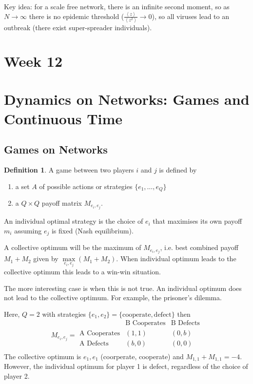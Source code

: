 \documentclass[12pt]{article}
\theoremstyle{definition}
\newtheorem{definition}{Definition}[section]
\newcommand{\ip}[1]{\left\langle{#1}\right\rangle}
\begin{document}
Key idea: for a scale free network, there is an infinite second moment, so as $N\to\infty$ there is no epidemic threshold ($\frac{\ip{z}}{\ip{z^2}}\to0$), so all viruses lead to an outbreak (there exist super-spreader individuals). 

\newpage
\section*{Week 12}

\section{Dynamics on Networks: Games and Continuous Time}

\subsection{Games on Networks}

\begin{definition}
    A game between two players $i$ and $j$ is defined by 
    \begin{enumerate}
        \item a set $A$ of possible actions or strategies $\{e_1,\dots, e_{Q}\}$
        \item a $Q\times Q$ payoff matrix $M_{e_i,e_j}$.
    \end{enumerate}
\end{definition}

An individual optimal strategy is the choice of $e_i$ that maximises its own payoff $m_i$ assuming $e_j$ is fixed (Nash equilibrium). 

A collective optimum will be the maximum of $M_{e_i,e_j}$, i.e. best combined payoff $M_1+M_2$ given by $\underset{e_i,e_j}{\max}{(M_1+M_2)}$. When individual optimum leads to the collective optimum this leads to a win-win situation. 

The more interesting case is when this is not true. An individual optimum does not lead to the collective optimum. For example, the prisoner's dilemma. 

Here, $Q=2$ with strategies $\{e_1,e_2\} = \{\text{cooperate}, \text{defect}\}$ then
\[  M_{e_i,e_j} = \begin{array}{c|c|c}
 & \text{B Cooperates} & \text{B Defects} \\
\hline
\text{A Cooperates} & (1, 1) & (0, b) \\
\text{A Defects} & (b, 0) & (0, 0) \\
\end{array}
\]
The collective optimum is $e_1,e_1$ (coorperate, cooperate) and $M_{1,1}+M_{1,1}=-4$. However, the individual optimum for player 1 is defect, regardless of the choice of player 2. 
\end{document}
